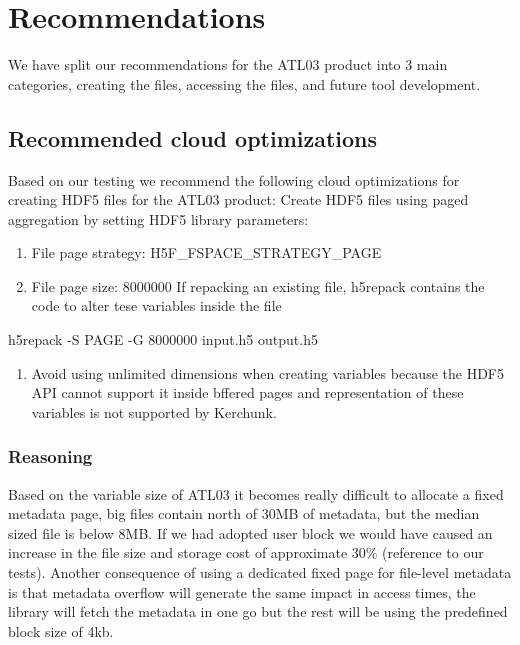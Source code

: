 \documentclass[
]{agujournal2019}
\newenvironment{Shaded}{\begin{snugshade}}{\end{snugshade}}
\newcommand{\AttributeTok}[1]{\textcolor[rgb]{0.40,0.45,0.13}{#1}}
\newcommand{\ExtensionTok}[1]{\textcolor[rgb]{0.00,0.23,0.31}{#1}}
\newcommand{\NormalTok}[1]{\textcolor[rgb]{0.00,0.23,0.31}{#1}}
\providecommand{\tightlist}{%
  \setlength{\itemsep}{0pt}\setlength{\parskip}{0pt}}\usepackage{longtable,booktabs,array}
\begin{document}
\section{Recommendations}\label{recommendations}

We have split our recommendations for the ATL03 product into 3 main
categories, creating the files, accessing the files, and future tool
development.

\subsection{Recommended cloud
optimizations}\label{recommended-cloud-optimizations}

Based on our testing we recommend the following cloud optimizations for
creating HDF5 files for the ATL03 product: Create HDF5 files using paged
aggregation by setting HDF5 library parameters:

\begin{enumerate}
\def\labelenumi{\arabic{enumi}.}
\tightlist
\item
  File page strategy: H5F\_FSPACE\_STRATEGY\_PAGE
\item
  File page size: 8000000 If repacking an existing file, h5repack
  contains the code to alter tese variables inside the file
\end{enumerate}

\begin{Shaded}
\begin{Highlighting}[]
 \ExtensionTok{h5repack} \AttributeTok{{-}S}\NormalTok{ PAGE }\AttributeTok{{-}G}\NormalTok{ 8000000 input.h5 output.h5}
\end{Highlighting}
\end{Shaded}

\begin{enumerate}
\def\labelenumi{\arabic{enumi}.}
\setcounter{enumi}{2}
\tightlist
\item
  Avoid using unlimited dimensions when creating variables because the
  HDF5 API cannot support it inside bffered pages and representation of
  these variables is not supported by Kerchunk.
\end{enumerate}

\subsubsection{Reasoning}\label{reasoning}

Based on the variable size of ATL03 it becomes really difficult to
allocate a fixed metadata page, big files contain north of 30MB of
metadata, but the median sized file is below 8MB. If we had adopted user
block we would have caused an increase in the file size and storage cost
of approximate 30\% (reference to our tests). Another consequence of
using a dedicated fixed page for file-level metadata is that metadata
overflow will generate the same impact in access times, the library will
fetch the metadata in one go but the rest will be using the predefined
block size of 4kb.
\end{document}
